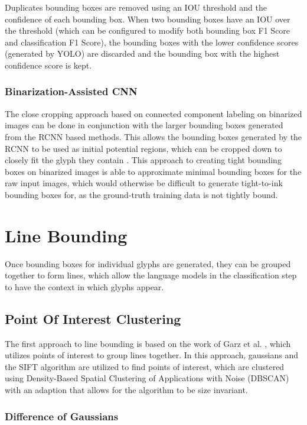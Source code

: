 Duplicates bounding boxes are removed using an IOU threshold and the confidence of each bounding box. When two bounding boxes have an IOU over the threshold (which can be configured to modify both bounding box F1 Score and classification F1 Score), the bounding boxes with the lower confidence scores (generated by YOLO) are discarded and the bounding box with the highest confidence score is kept.

\subsubsection{Binarization-Assisted CNN}

The close cropping approach based on connected component labeling on binarized images can be done in conjunction with the larger bounding boxes generated from the RCNN based methods. This allows the bounding boxes generated by the RCNN to be used as initial potential regions, which can be cropped down to closely fit the glyph they contain . This approach to creating tight bounding boxes on binarized images is able to approximate minimal bounding boxes for the raw input images, which would otherwise be difficult to generate tight-to-ink bounding boxes for, as the ground-truth training data is not tightly bound.

\section{Line Bounding}

Once bounding boxes for individual glyphs are generated, they can be grouped together to form lines, which allow the language models in the classification step to have the context in which glyphs appear.

\subsection{Point Of Interest Clustering}

The first approach to line bounding is based on the work of Garz et al. \cite{Garz2011, Garz2012}, which utilizes points of interest to group lines together. In this approach, gaussians and the SIFT algorithm are utilized to find points of interest, which are clustered using Density-Based Spatial Clustering of Applications with Noise (DBSCAN) \cite{Ester} with an adaption that allows for the algorithm to be size invariant.

\subsubsection{Difference of Gaussians}

